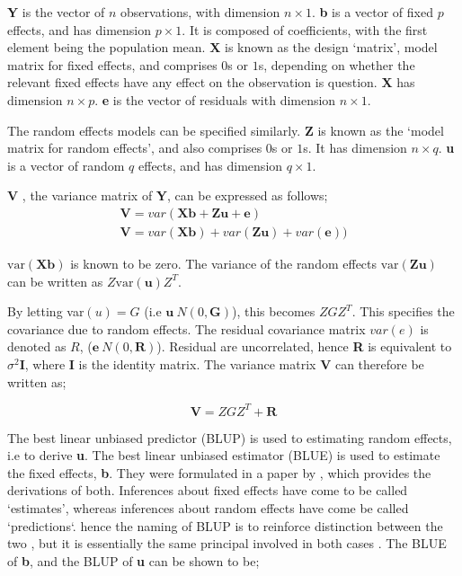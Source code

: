 \begin{itemize}
\textbf{Y} is the vector of $n$ observations, with dimension $n
\times 1$. \textbf{b} is a vector of fixed $p$ effects, and has
dimension $p \times 1$. It is composed of coefficients, with the
first element being the population mean.  \textbf{X} is known as
the design `matrix', model matrix for fixed effects, and comprises
$0$s or $1$s, depending on whether the relevant fixed effects have
any effect on the observation is question. \textbf{X} has
dimension $n \times p$. \textbf{e} is the vector of residuals with
dimension $n \times 1$.

The random effects models can be specified similarly. \textbf{Z}
is known as the `model matrix for random effects', and also
comprises $0$s or $1$s. It has dimension $n \times q$. \textbf{u
}is a vector of random $q$ effects, and has dimension $q \times
1$.


\textbf{V} , the variance matrix of \textbf{Y}, can be expressed
as follows;
\begin{eqnarray}
\textbf{V}= var ( \textbf{Xb} + \textbf{Zu} + \textbf{e})\\
\textbf{V}= var ( \textbf{Xb} ) + var (\textbf{Zu}) +
var(\textbf{e}))
\end{eqnarray}

$\mbox{var}(\textbf{Xb})$ is known to be zero. The variance of the
random effects $\mbox{var}(\textbf{Zu})$ can be written as
$Z\mbox{var}(\textbf{u})Z^{T}$.

By letting var$(u) = G$ (i.e $\textbf{u} ~ N(0,\textbf{G})$), this
becomes $ZGZ^{T}$. This specifies the covariance due to random
effects. The residual covariance matrix $var(e)$ is denoted as
$R$, ($\textbf{e} ~ N(0,\textbf{R})$). Residual are uncorrelated,
hence \textbf{R} is equivalent to $\sigma^{2}$\textbf{I}, where
\textbf{I} is the identity matrix. The variance matrix \textbf{V}
can therefore be written as;

\begin{equation}
\textbf{V}  = ZGZ^{T} + \textbf{R}
\end{equation}


The best linear unbiased predictor (BLUP) is used to estimating
random effects, i.e to derive \textbf{u}. The best linear unbiased
estimator (BLUE) is used to estimate the fixed effects,
\textbf{b}. They were formulated in a paper by \cite{Henderson59},
which provides the derivations of both. Inferences about fixed
effects have come to be called `estimates', whereas inferences
about random effects have come be called `predictions`. hence the
naming of BLUP is to reinforce distinction between the two , but
it is essentially the same principal involved in both cases
\citep{Robinson}. The BLUE of \textbf{b}, and the BLUP of
\textbf{u} can be shown to be;


\end{itemize}
